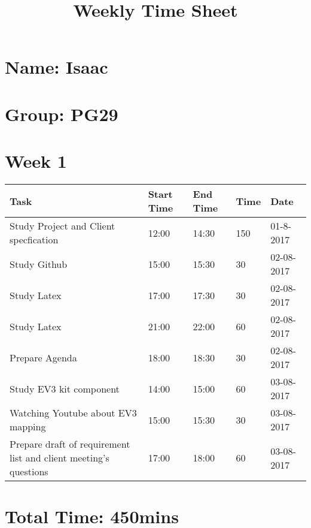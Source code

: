 \documentclass[14]{article}
\title{Weekly Time Sheet}
\begin{document}
\maketitle

\section*{Name: Isaac}
\vspace*{10pt}
\section*{Group: PG29}
\vspace*{10pt}
\section*{Week 1}
\vspace*{10pt}

\begin{tabular}{|l|l|l|l|l|}\hline
Task           & Start Time & End Time & Time   & Date \\ \hline
Study Project and Client specfication & 12:00 & 14:30 & 150 &  01-8-2017 \\ \hline
Study Github   & 15:00      & 15:30     & 30      & 02-08-2017 \\ \hline
Study Latex    & 17:00      & 17:30     & 30      & 02-08-2017 \\ \hline
Study Latex    & 21:00      & 22:00     & 60      & 02-08-2017 \\ \hline
Prepare Agenda & 18:00      & 18:30     & 30      & 02-08-2017 \\ \hline
Study EV3 kit component & 14:00 & 15:00 & 60 & 03-08-2017 \\ \hline
Watching Youtube about EV3 mapping & 15:00 & 15:30 & 30 & 03-08-2017 \\ \hline
Prepare draft of requirement list and client meeting's questions & 17:00 & 18:00 & 60 & 03-08-2017 \\ \hline 

									    
\end{tabular}

\vspace*{10pt}
\section*{Total Time: 450mins}
\end{document}

